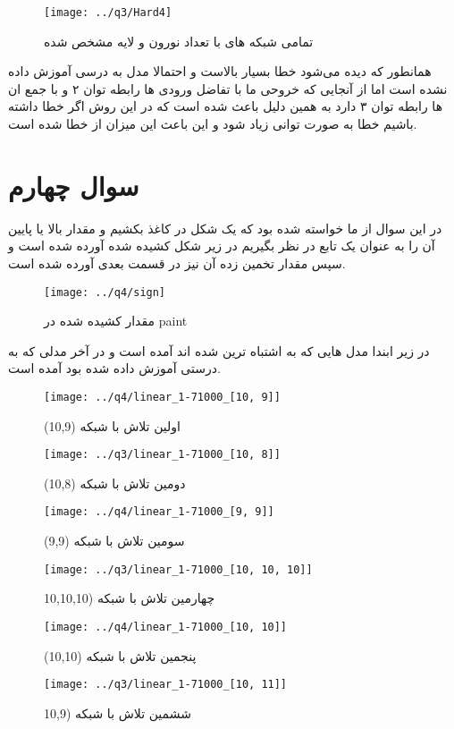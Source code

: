 \documentclass[a4paper,12pt]{article}
\begin{document}
\begin{figure}[H]
\begin{center}

  \texttt{[image: ../q3/Hard4]}
  \center
  \caption{ تمامی شبکه ‌های با تعداد نورون و لایه مشخص شده }
  \center
\end{center}
\end{figure}

همانطور که دیده می‌شود خطا بسیار بالاست و احتمالا مدل به درسی آموزش داده نشده است اما از آنجایی که خروحی ما با تفاضل ورودی ها رابطه توان ۲ و با جمع ان ها رابطه توان ۳ دارد به همین دلیل باعث شده است که در این روش اگر خطا داشته باشیم خطا به صورت توانی زیاد شود و این باعث این میزان از خطا شده است.
\newpage
\section{سوال چهارم}
در این سوال از ما خواسته شده بود که یک شکل در کاغذ بکشیم و مقدار بالا یا پایین آن را به عنوان یک تابع در نظر بگیریم در زیر شکل کشیده شده آورده شده است و سپس مقدار تخمین زده آن نیز در قسمت بعدی آورده شده است.
\begin{figure}[H]
\begin{center}

  \texttt{[image: ../q4/sign]}
  \center
  \caption{ مقدار کشیده شده در paint}
\end{center}
\end{figure}
در زیر ابندا مدل هایی که به اشتباه ترین شده اند آمده است و در آخر مدلی که به درستی آموزش داده شده بود آمده است.

\begin{figure}[!htb]
  \texttt{[image: ../q4/linear\_1-71000\_[10, 9]]}
  \caption{  اولین تلاش با شبکه (10,9) }
\endminipage\hfill
{}
  \texttt{[image: ../q3/linear\_1-71000\_[10, 8]]}
  \caption{دومین تلاش با شبکه (10,8) }
\endminipage\hfill
\end{figure}

\begin{figure}[!htb]
  \texttt{[image: ../q4/linear\_1-71000\_[9, 9]]}
  \caption{  سومین تلاش با شبکه (9,9) }
\endminipage\hfill
{}
  \texttt{[image: ../q3/linear\_1-71000\_[10, 10, 10]]}
  \caption{چهارمین تلاش با شبکه (10,10,10 }
\endminipage\hfill
\end{figure}

\begin{figure}[!htb]
  \texttt{[image: ../q4/linear\_1-71000\_[10, 10]]}
  \caption{  پنجمین تلاش با شبکه (10,10) }
\endminipage\hfill
{}
  \texttt{[image: ../q3/linear\_1-71000\_[10, 11]]}
  \caption{ششمین تلاش با شبکه (10,9 }
\endminipage\hfill
\end{figure}
\end{document}
